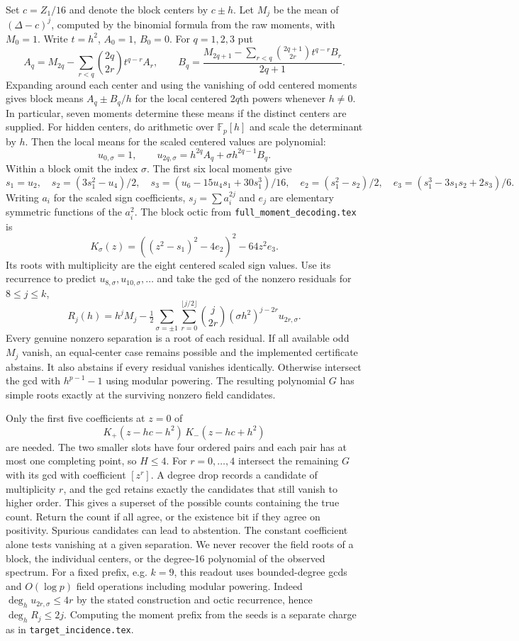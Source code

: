 \documentclass[11pt]{article}
\newcommand{\F}{\mathbb F}
\begin{document}
Set $c=Z_1/16$ and denote the block centers by $c\pm h$. Let $M_j$ be the
mean of $(\Delta-c)^j$, computed by the binomial formula from the raw
moments, with $M_0=1$. Write $t=h^2$, $A_0=1$, $B_0=0$. For $q=1,2,3$ put
\[
 A_q=M_{2q}-\sum_{r<q}{2q\choose 2r}t^{q-r}A_r,\qquad
 B_q=\frac{M_{2q+1}-\sum_{r<q}{2q+1\choose 2r}t^{q-r}B_r}{2q+1}.
\]
Expanding around each center and using the vanishing of odd centered
moments gives block means $A_q\pm B_q/h$ for the local centered $2q$th
powers whenever $h\ne0$. In particular, seven moments determine these
means if the distinct centers are supplied. For hidden centers, do
arithmetic over $\F_p[h]$ and scale the determinant by $h$. Then the
local means for the scaled centered values are polynomial:
\[
 u_{0,\sigma}=1,\qquad u_{2q,\sigma}=h^{2q}A_q+\sigma h^{2q-1}B_q .
\]
Within a block omit the index $\sigma$. The first six local moments give
\[
 s_1=u_2,\quad s_2=(3s_1^2-u_4)/2,\quad
 s_3=(u_6-15u_4s_1+30s_1^3)/16,\quad
 e_2=(s_1^2-s_2)/2,\quad e_3=(s_1^3-3s_1s_2+2s_3)/6 .
\]
Writing $a_i$ for the scaled sign coefficients, $s_j=\sum a_i^{2j}$
and $e_j$ are elementary symmetric functions of the $a_i^2$.
The block octic from \texttt{full\_moment\_decoding.tex} is
\[
 K_\sigma(z)=((z^2-s_1)^2-4e_2)^2-64z^2e_3 .
\]
Its roots with multiplicity are the eight centered scaled sign values.
Use its recurrence to predict $u_{8,\sigma},u_{10,\sigma},\ldots$ and take
the gcd of the nonzero residuals for $8\le j\le k$,
\[
 R_j(h)=h^jM_j-\tfrac12\sum_{\sigma=\pm1}
  \sum_{r=0}^{\lfloor j/2\rfloor}{j\choose 2r}
  (\sigma h^2)^{j-2r}u_{2r,\sigma}.
\]
Every genuine nonzero separation is a root of each residual. If all
available odd $M_j$ vanish, an equal-center case remains possible and the
implemented certificate abstains. It also abstains if every residual
vanishes identically. Otherwise intersect the gcd with $h^{p-1}-1$ using
modular powering. The resulting polynomial $G$ has simple roots exactly
at the surviving nonzero field candidates.

Only the first five coefficients at $z=0$ of
\[
 K_+(z-hc-h^2)\,K_-(z-hc+h^2)
\]
are needed. The two smaller slots have four ordered pairs and each pair
has at most one completing point, so $H\le4$. For $r=0,\ldots,4$ intersect
the remaining $G$ with its gcd with coefficient $[z^r]$. A degree drop
records a candidate of multiplicity $r$, and the gcd retains exactly the
candidates that still vanish to higher order. This gives a superset of
the possible counts containing the true count. Return the count if all
agree, or the existence bit if they agree on positivity. Spurious candidates
can lead to abstention. The constant coefficient alone tests vanishing
at a given separation. We never recover the field roots of a block, the
individual centers, or the degree-16 polynomial of the observed spectrum.
For a fixed prefix, e.g. $k=9$, this readout uses bounded-degree gcds
and $O(\log p)$ field operations including modular powering. Indeed
$\deg_h u_{2r,\sigma}\le4r$ by the stated construction and octic
recurrence, hence $\deg_hR_j\le2j$. Computing the moment prefix from the
seeds is a separate charge as in \texttt{target\_incidence.tex}.
\end{document}
